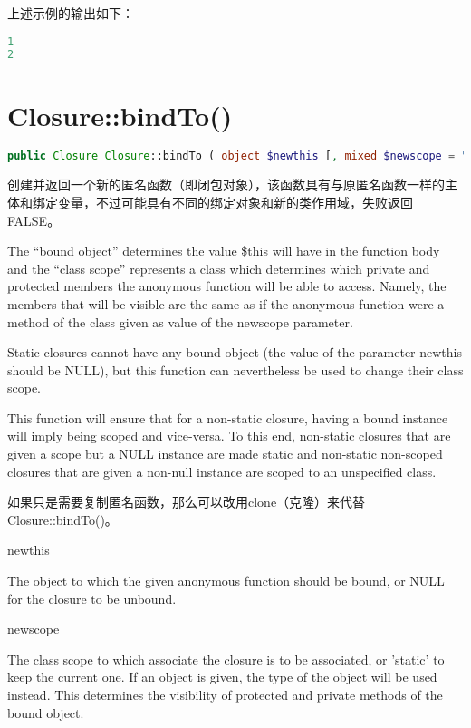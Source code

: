 上述示例的输出如下：

\begin{lstlisting}[language=PHP]
1
2
\end{lstlisting}

\section{Closure::bindTo()}



\begin{lstlisting}[language=PHP]
public Closure Closure::bindTo ( object $newthis [, mixed $newscope = "static" ] )
\end{lstlisting}

创建并返回一个新的匿名函数（即闭包对象），该函数具有与原匿名函数一样的主体和绑定变量，不过可能具有不同的绑定对象和新的类作用域，失败返回FALSE。

The “bound object” determines the value \$this will have in the function body and the “class scope” represents a class which determines which private and protected members the anonymous function will be able to access. Namely, the members that will be visible are the same as if the anonymous function were a method of the class given as value of the newscope parameter.

Static closures cannot have any bound object (the value of the parameter newthis should be NULL), but this function can nevertheless be used to change their class scope.

This function will ensure that for a non-static closure, having a bound instance will imply being scoped and vice-versa. To this end, non-static closures that are given a scope but a NULL instance are made static and non-static non-scoped closures that are given a non-null instance are scoped to an unspecified class.


如果只是需要复制匿名函数，那么可以改用clone（克隆）来代替Closure::bindTo()。

\begin{compactitem}
\item newthis

The object to which the given anonymous function should be bound, or NULL for the closure to be unbound.

\item newscope

The class scope to which associate the closure is to be associated, or 'static' to keep the current one. If an object is given, the type of the object will be used instead. This determines the visibility of protected and private methods of the bound object.

\end{compactitem}



